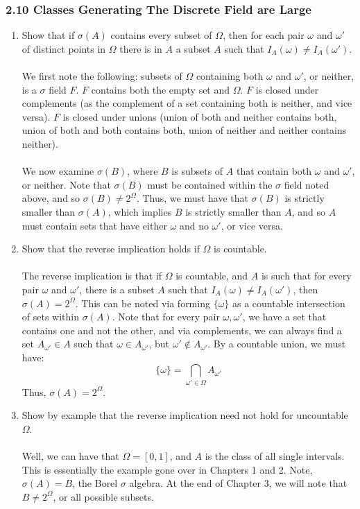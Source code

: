 \documentclass[12pt,a4paper]{article}
\newcommand{\1}[1]{\mathbbm{1}\left\{ #1 \right\}}
\begin{document}
\subsubsection{2.10 Classes Generating The Discrete Field are Large} 
\begin{enumerate}
	\item Show that if $\sigma(A)$ contains every subset of $\Omega$, then for each pair $\omega$ and $\omega'$ of distinct points in $\Omega$ there is in $A$ a subset $A$ such that $I_A(\omega) \neq I_A(\omega')$.
	\\\\
	We first note the following: subsets of $\Omega$ containing both $\omega$ and $\omega'$, or neither, is a $\sigma$ field $F$. $F$ contains both the empty set and $\Omega$. $F$ is closed under complements (as the complement of a set containing both is neither, and vice versa). $F$ is closed under unions (union of both and neither contains both, union of both and both contains both, union of neither and neither contains neither).
	\\\\
	We now examine $\sigma(B)$, where $B$ is subsets of $A$ that contain both $\omega$ and $\omega'$, or neither. Note that $\sigma(B)$ must be contained within the $\sigma$ field noted above, and so $\sigma(B) \neq 2^\Omega$. Thus, we must have that $\sigma(B)$ is strictly smaller than $\sigma(A)$, which implies $B$ is strictly smaller than $A$, and so $A$ must contain sets that have either $\omega$ and no $\omega'$, or vice versa.
	
	\item Show that the reverse implication holds if $\Omega$ is countable.
	\\\\
	The reverse implication is that if $\Omega$ is countable, and $A$ is such that for every pair $\omega$ and $\omega'$, there is a subset $A$ such that $I_A(\omega) \neq I_A(\omega')$, then $\sigma(A) = 2^\Omega$. This can be noted via forming $\{\omega\}$ as a countable intersection of sets within $\sigma(A)$. Note that for every pair $\omega,\omega'$, we have a set that contains one and not the other, and via complements, we can always find a set $A_{\omega'} \in A$ such that $\omega \in A_{\omega'}$, but $\omega' \not\in A_{\omega'}$. By a countable union, we must have:
	$$
		\{\omega\} = \bigcap_{\omega' \in \Omega} A_{\omega'}
	$$
	Thus, $\sigma(A) = 2^\Omega$.
	
	\item Show by example that the reverse implication need not hold for uncountable $\Omega$.
	\\\\
	Well, we can have that $\Omega = [0,1]$, and $A$ is the class of all single intervals. This is essentially the example gone over in Chapters 1 and 2. Note, $\sigma(A) = B$, the Borel $\sigma$ algebra. At the end of Chapter 3, we will note that $B \neq 2^\Omega$, or all possible subsets. 
\end{enumerate}
\end{document}

